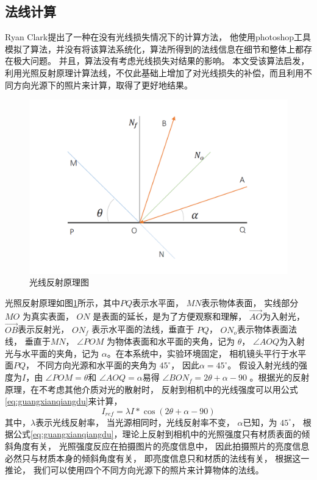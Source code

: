 \subsection{法线计算}


 Ryan Clark\cite{zarria.net}提出了一种在没有光线损失情况下的计算方法，
 他使用photoshop工具模拟了算法，并没有将该算法系统化，算法所得到的法线信息在细节和整体上都存在极大问题。
 并且，算法没有考虑光线损失对结果的影响。
 本文受该算法启发，利用光照反射原理计算法线，不仅此基础上增加了对光线损失的补偿，而且利用不同方向光源下的照片来计算，取得了更好地结果。

\begin{figure}[htbp]
\centering
\includegraphics[width=1.0\linewidth]{figures/guangxianfanshetu.png}
\caption{光线反射原理图}
\label{fig:guangxianfanshetu}
\end{figure}

光照反射原理如图\ref{fig:guangxianfanshetu}所示，其中$PQ$表示水平面，
$MN$表示物体表面，
实线部分$MO$
为真实表面，
$ON$
是表面的延长，是为了方便观察和理解，
$\overrightarrow{AO}$为入射光，
$\overrightarrow{OB}$表示反射光，
$ON_f$
表示水平面的法线，垂直于
$PQ$，
$ON_o$表示物体表面法线，
垂直于$MN$，
$\angle POM$
为物体表面和水平面的夹角，记为
$\theta $，
$\angle AOQ$为入射光与水平面的夹角，记为
$\alpha$。在本系统中，实验环境固定，
相机镜头平行于水平面$PQ$，
不同方向光源和水平面的夹角为
$45^{\circ}$，
因此$\alpha=45^{\circ}$。
假设入射光线的强度为$I$，由
$\angle POM=\theta$和
$\angle AOQ=\alpha$易得
$\angle {BON}_f=2\theta+\alpha-90$
。根据光的反射原理，在不考虑其他介质对光的散射时，
反射到相机中的光线强度可以用公式\eqref{eq:guangxianqiangdu}来计算，
\begin{equation}
\label{eq:guangxianqiangdu}
I_{ref}=\lambda I* \cos (2\theta +\alpha-90)
\end{equation}
其中，$\lambda$表示光线反射率，
当光源相同时，光线反射率不变，
$\alpha$已知，为
$45^{\circ}$，
根据公式\eqref{eq:guangxianqiangdu}，理论上反射到相机中的光照强度只有材质表面的倾斜角度有关，
光照强度反应在拍摄图片的亮度信息中，
因此拍摄照片的亮度信息必然只与材质本身的倾斜角度有关，
即亮度信息只和材质的法线有关，
根据这一推论，
我们可以使用四个不同方向光源下的照片来计算物体的法线。

